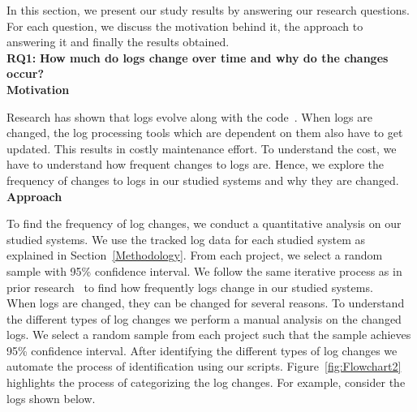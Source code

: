 In this section, we present our study results by answering our research questions. For each question, we discuss the motivation behind it, the approach to answering it and finally the results obtained. 
\\

\noindent\textbf{RQ1:} \textbf{How much do logs change over time and why do the changes occur?}
\\

\noindent\textbf{Motivation}

Research has shown that logs evolve along with the code~\cite{IanContextinformation}. When logs are changed, the log  processing tools which are dependent on them also have to get updated. This results in costly maintenance effort. To understand the cost, we have to understand how frequent changes to logs are. Hence, we explore the frequency of changes to logs in our studied systems and why they are changed.\\

\noindent \textbf{Approach}

To find the frequency of log changes, we conduct a quantitative analysis on our studied systems. We use the tracked log data for each studied system as explained in Section~\ref{Methodology}. From each project, we select a random sample with 95\% confidence interval. We follow the same iterative process as in prior research~\cite{IanIcesm} to find how frequently logs change in our studied systems. \\

When logs are changed, they can be changed for several reasons. To understand the different types of log changes we perform a manual analysis on the changed logs. We select a random sample from each project such that the sample achieves 95\% confidence interval. After identifying the different types of log changes we automate the process of identification using our scripts. Figure~\ref{fig:Flowchart2} highlights the process of categorizing the log changes. For example, 
consider the logs shown below. 



